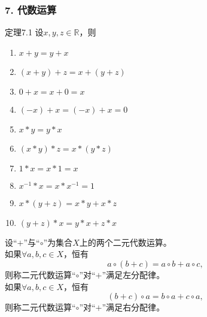 \documentclass{beamer}
\begin{document}
\begin{CJK*}{UTF8}{gbsn}
\begin{frame}
  \frametitle{7. 代数运算}
  \begin{minipage}[t]{0.49\linewidth}
  \begin{block}{定理7.1}
    设$x, y, z \in \mathbb{R}$，则
   \begin{enumerate}
   \item   $x + y = y + x$
   \item   $(x + y) + z = x + (y + z)$
   \item   $0 + x = x + 0 = x$
   \item   $(-x) + x = (-x) + x = 0$
   \item   $x * y = y * x$
   \item   $(x * y) * z = x * (y *z)$
   \item   $1 * x = x * 1 = x$
   \item   $x^{-1} * x = x * x^{-1} = 1$
   \item   $x* (y + z) = x * y + x * z$
   \item   $(y + z) * x = y * x + z * x$
    \end{enumerate}
  \end{block}\pause
\end{minipage}
\begin{minipage}[t]{0.49\linewidth}
  \begin{Def}
    设“$+$”与“$\circ$”为集合$X$上的两个二元代数运算。\\如果$\forall a, b, c \in X$，恒有\[a \circ (b + c) = a \circ b + a \circ c,\] 则称二元代数运算“$\circ$”对“$+$”满足\alert{左分配律}。
    \\如果$\forall a, b, c \in X$，恒有\[(b + c)\circ a = b \circ a + c \circ a,\] 则称二元代数运算“$\circ$”对“$+$”满足\alert{右分配律}。
  \end{Def}
\end{minipage}
\end{frame}


\end{CJK*}
\end{document}
